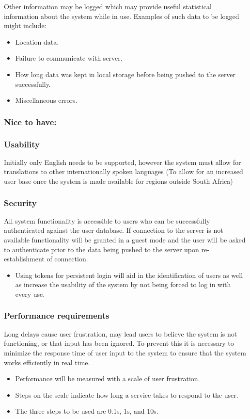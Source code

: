 \documentclass[hidelinks,a4paper,12pt]{article}
\begin{document}
	Other information may be logged which may provide useful statistical information about the system while in use. Examples of such data to be logged might include:
	\begin{itemize}
		\item Location data.
		\item Failure to communicate with server.
		\item How long data was kept in local storage before being pushed to the server successfully.
		\item Miscellaneous errors.
	\end{itemize}
	
	\subsubsection{Nice to have:}
	
	\subsubsection*{Usability}
	Initially only English needs to be supported, however the system must allow for translations to other internationally spoken languages (To allow for an increased user base once the system is made available for regions outside South Africa)	
	
	\subsubsection*{Security}
	All system functionality is accessible to users who can be successfully authenticated against the user database. If connection to the server is not available functionality will be granted in a guest mode and the user will be asked to authenticate prior to the data being pushed to the server upon re-establishment of connection.
	\begin{itemize}
		\item Using tokens for persistent login will aid in the identification of users as well as increase the usability of the system by not being forced to log in with every use.
	\end{itemize}
	
	\subsubsection*{Performance requirements}	
	Long delays cause user frustration, may lead users to believe the system is not functioning, or that input has been ignored. To prevent this it is necessary to minimize the response time of user input to the system to ensure that the system works efficiently in real time.
	\begin{itemize}
		\item Performance will be measured with a scale of user frustration.
		\item Steps on the scale indicate how long a service takes to respond to the user.
		\item The three steps to be used are 0.1s, 1s, and 10s.
	\end{itemize}				
\end{document}
